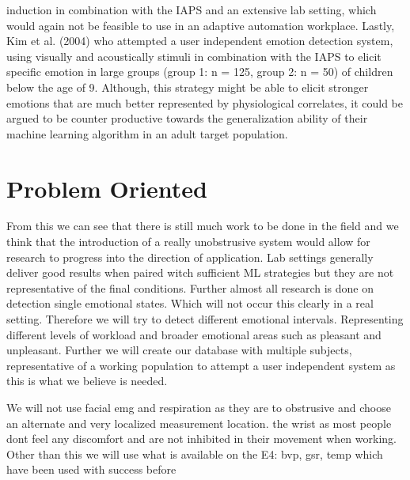 induction in combination with the IAPS and an extensive lab setting, which would again not be feasible to use in an adaptive automation workplace. Lastly, Kim et al. (2004) who attempted a user independent emotion detection system, using visually and acoustically stimuli in combination with the IAPS to elicit specific emotion in large groups (group 1: n = 125, group 2: n = 50) of children below the age of 9. Although, this strategy might be able to elicit stronger emotions that are much better represented by physiological correlates, it could be argued to be counter productive towards the generalization ability of their machine learning algorithm in an adult target population. 

\section{Problem Oriented}
From this we can see that there is still much work to be done in the field and we think that the introduction of a really unobstrusive system would allow for research to progress into the direction of application.
Lab settings generally deliver good results when paired witch sufficient ML strategies but they are not representative of the final conditions.
Further almost all research is done on detection single emotional states. Which will not occur this clearly in a real setting.
Therefore we will try to detect different emotional intervals.
Representing different levels of workload and broader emotional areas such as pleasant and unpleasant.
Further we will create our database with multiple subjects, representative of a working population to attempt a user independent system as this is what we believe is needed.

We will not use facial emg and respiration as they are to obstrusive and choose an alternate and very localized measurement location. the wrist as most people dont feel any discomfort and are not inhibited in their movement when working.
Other than this we will use what is available on the E4: bvp, gsr, temp which have been used with success before
